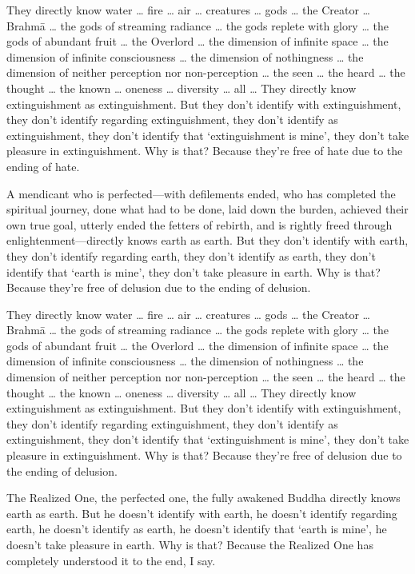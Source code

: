\documentclass[12pt,openany]{book}%
\begin{document}
They directly know water … fire … air … creatures … gods … the Creator … \textsanskrit{Brahmā} … the gods of streaming radiance … the gods replete with glory … the gods of abundant fruit … the Overlord … the dimension of infinite space … the dimension of infinite consciousness … the dimension of nothingness … the dimension of neither perception nor non-perception … the seen … the heard … the thought … the known … oneness … diversity … all … They directly know extinguishment as extinguishment. But they don’t identify with extinguishment, they don’t identify regarding extinguishment, they don’t identify as extinguishment, they don’t identify that ‘extinguishment is mine’, they don’t take pleasure in extinguishment. Why is that? Because they’re free of hate due to the ending of hate. 

A mendicant who is perfected—with defilements ended, who has completed the spiritual journey, done what had to be done, laid down the burden, achieved their own true goal, utterly ended the fetters of rebirth, and is rightly freed through enlightenment—directly knows earth as earth. But they don’t identify with earth, they don’t identify regarding earth, they don’t identify as earth, they don’t identify that ‘earth is mine’, they don’t take pleasure in earth. Why is that? Because they’re free of delusion due to the ending of delusion. 

They directly know water … fire … air … creatures … gods … the Creator … \textsanskrit{Brahmā} … the gods of streaming radiance … the gods replete with glory … the gods of abundant fruit … the Overlord … the dimension of infinite space … the dimension of infinite consciousness … the dimension of nothingness … the dimension of neither perception nor non-perception … the seen … the heard … the thought … the known … oneness … diversity … all … They directly know extinguishment as extinguishment. But they don’t identify with extinguishment, they don’t identify regarding extinguishment, they don’t identify as extinguishment, they don’t identify that ‘extinguishment is mine’, they don’t take pleasure in extinguishment. Why is that? Because they’re free of delusion due to the ending of delusion. 

The Realized One, the perfected one, the fully awakened Buddha directly knows earth as earth. But he doesn’t identify with earth, he doesn’t identify regarding earth, he doesn’t identify as earth, he doesn’t identify that ‘earth is mine’, he doesn’t take pleasure in earth. Why is that? Because the Realized One has completely understood it to the end, I say. 
\end{document}
